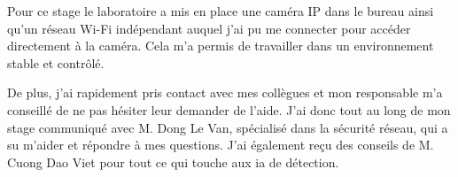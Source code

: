 \begin{appendices}
Pour ce stage le laboratoire a mis en place une caméra IP dans le bureau ainsi qu'un réseau Wi-Fi indépendant auquel j'ai pu me connecter pour accéder directement à la caméra. Cela m'a permis de travailler dans un environnement stable et contrôlé. 

De plus, j'ai rapidement pris contact avec mes collègues et mon responsable m'a conseillé de ne pas hésiter leur demander de l'aide. J'ai donc tout au long de mon stage communiqué avec M. Dong Le Van, spécialisé dans la sécurité réseau, qui a su m'aider et répondre à mes questions. J'ai également reçu des conseils de M. Cuong Dao Viet pour tout ce qui touche aux \acrshort{ia} de détection.

\end{appendices}




